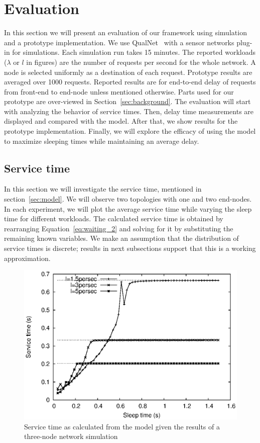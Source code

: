 \section{Evaluation}

In this section we will present an evaluation of our framework using simulation and a prototype implementation. We use QualNet~\cite{16} with a sensor networks plug-in for simulations. Each simulation run takes 15 minutes. The reported workloads ($\lambda$ or $l$ in figures) are the number of requests per second for the whole network. A node is selected uniformly as a destination of each request. Prototype results are averaged over 1000 requests. Reported results are for end-to-end delay of requests from front-end to end-node unless mentioned otherwise. Parts used for our prototype are over-viewed in Section~\ref{sec:background}. The evaluation will start with analyzing the behavior of service times. Then, delay time measurements are displayed and compared with the model. After that, we show results for the prototype implementation. Finally, we will explore the efficacy of using the model to maximize sleeping times while maintaining an average delay.

\subsection{Service time}
In this section we will investigate the service time, mentioned in section~\ref{sec:model}. We will observe two topologies with one and two end-nodes. In each experiment, we will plot the average service time while varying the sleep time for different workloads. The calculated service time is obtained by rearranging Equation~\ref{eq:waiting_2} and solving for it by substituting the remaining known variables. We make an assumption that the distribution of service times is discrete; results in next subsections support that this is a working approximation. 

\begin{figure}[t]
\centering
\includegraphics[scale=0.65]{figures/3node_varySleep_sim_x.eps}
\caption{Service time as calculated from the model given the results of a three-node network simulation}
\label{fig:3nodes_x}
\end{figure}

